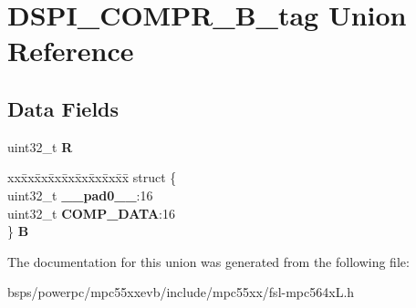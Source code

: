 \hypertarget{unionDSPI__COMPR__32B__tag}{}\section{D\+S\+P\+I\+\_\+\+C\+O\+M\+P\+R\+\_\+B\+\_\+tag Union Reference}
\label{unionDSPI__COMPR__32B__tag}
\subsection*{Data Fields}
\begin{DoxyCompactItemize}
\item 
\mbox{\label{unionDSPI__COMPR__32B__tag_a83f3d395e9068d5f52540cc1166c6b52}} 
uint32\+\_\+t {\bfseries R}
\item 
\mbox{\label{unionDSPI__COMPR__32B__tag_a9f9ad26ec72935f26df40b06fef6c6f8}} 
\begin{tabbing}
xx\=xx\=xx\=xx\=xx\=xx\=xx\=xx\=xx\=\kill
struct \{\\
\>uint32\_t {\bfseries \_\_pad0\_\_}:16\\
\>uint32\_t {\bfseries COMP\_DATA}:16\\
\} {\bfseries B}\\

\end{tabbing}\end{DoxyCompactItemize}


The documentation for this union was generated from the following file\+:\begin{DoxyCompactItemize}
\item 
bsps/powerpc/mpc55xxevb/include/mpc55xx/fsl-\/mpc564x\+L.\+h\end{DoxyCompactItemize}

